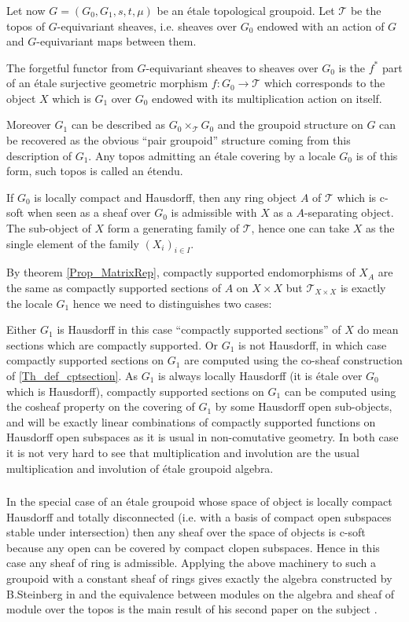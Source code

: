 \documentclass[a4paper]{article}
\newcommand{\Tcal}{\mathcal{T}}
\newcommand{\block}[1]
{

\par \subsubsection{} #1

\bigskip}
\begin{document}
\block{\label{Ex_etalegpd}Let now $G=(G_0,G_1,s,t,\mu)$ be an étale topological groupoid. Let $\Tcal$ be the topos of $G$-equivariant sheaves, i.e. sheaves over $G_0$ endowed with an action of $G$ and $G$-equivariant maps between them.

The forgetful functor from $G$-equivariant sheaves to sheaves over $G_0$ is the $f^*$ part of an étale surjective geometric morphism $f: G_0 \rightarrow \Tcal$ which corresponds to the object $X$ which is $G_1$ over $G_0$ endowed with its multiplication action on itself.

Moreover $G_1$ can be described as $G_0 \times_{\Tcal} G_0$ and the groupoid structure on $G$ can be recovered as the obvious ``pair groupoid'' structure coming from this description of $G_1$. Any topos admitting an étale covering by a locale $G_0$ is of this form, such topos is called an étendu.


If $G_0$ is locally compact and Hausdorff, then any ring object $A$ of $\Tcal$ which is c-soft when seen as a sheaf over $G_0$ is admissible with $X$ as a $A$-separating object. The sub-object of $X$ form a generating family of $\Tcal$, hence one can take $X$ as the single element of the family $(X_i)_{i \in I}$.

By theorem \ref{Prop_MatrixRep}, compactly supported endomorphisms of $X_A$ are the same as compactly supported sections of $A$ on $X \times X$ but $\Tcal_{X \times X}$ is exactly the locale $G_1$ hence we need to distinguishes two cases:

Either $G_1$ is Hausdorff in this case ``compactly supported sections'' of $X$ do mean sections which are compactly supported. Or $G_1$ is not Hausdorff, in which case compactly supported sections on $G_1$ are computed using the co-sheaf construction of \ref{Th_def_cptsection}. As $G_1$ is always locally Hausdorff (it is étale over $G_0$ which is Hausdorff), compactly supported sections on $G_1$ can be computed using the cosheaf property on the covering of $G_1$ by some Hausdorff open sub-objects, and will be exactly linear combinations of compactly supported functions on Hausdorff open subspaces as it is usual in non-comutative geometry. In both case it is not very hard to see that multiplication and involution are the usual multiplication and involution of étale groupoid algebra.
}




\block{In the special case of an étale groupoid whose space of object is locally compact Hausdorff and totally disconnected (i.e. with a basis of compact open subspaces stable under intersection) then any sheaf over the space of objects is c-soft because any open can be covered by compact clopen subspaces. Hence in this case any sheaf of ring is admissible. Applying the above machinery to such a groupoid with a constant sheaf of rings gives exactly the algebra constructed by B.Steinberg in \cite{steinberg2010groupoid} and the equivalence between modules on the algebra and sheaf of module over the topos is the main result of his second paper on the subject \cite{steinberg2014modules}.}
\end{document}
